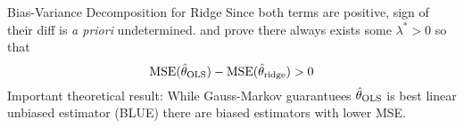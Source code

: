 \documentclass[11pt,compress,t,notes=noshow, xcolor=table]{beamer}
\begin{document}
\begin{vbframe}{Bias-Variance Decomposition for Ridge}
Since both terms are positive, sign of their diff is \textit{a priori} undetermined.  and  prove there always exists some $\lambda^{\ast}>0$ so that
$$\text{MSE}(\hat{\theta}_{\text{OLS}})-\text{MSE}(\hat{\theta}_{\text{ridge}})>0$$
Important theoretical result: While Gauss-Markov guarantuees $\hat{\theta}_{\text{OLS}}$ is best linear unbiased estimator (BLUE) there are biased estimators with lower MSE.

\end{vbframe}





\endlecture
\end{document}

